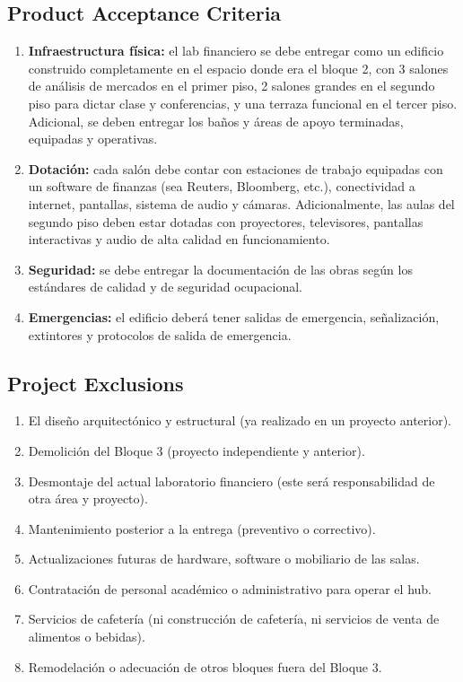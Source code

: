 \subsection{Product Acceptance Criteria}

\begin{enumerate}
    \item \textbf{Infraestructura física:} el lab financiero se debe entregar como un edificio construido completamente en el espacio donde era el bloque 2, con 3 salones de análisis de mercados en el primer piso, 2 salones grandes en el segundo piso para dictar clase y conferencias, y una terraza funcional en el tercer piso. Adicional, se deben entregar los baños y áreas de apoyo terminadas, equipadas y operativas.
    \item \textbf{Dotación:} cada salón debe contar con estaciones de trabajo equipadas con un software de finanzas (sea Reuters, Bloomberg, etc.), conectividad a internet, pantallas, sistema de audio y cámaras. Adicionalmente, las aulas del segundo piso deben estar dotadas con proyectores, televisores, pantallas interactivas y audio de alta calidad en funcionamiento.
    \item \textbf{Seguridad:} se debe entregar la documentación de las obras según los estándares de calidad y de seguridad ocupacional.
    \item \textbf{Emergencias:} el edificio deberá tener salidas de emergencia, señalización, extintores y protocolos de salida de emergencia.
\end{enumerate}

\subsection{Project Exclusions}

\begin{enumerate}
    \item El diseño arquitectónico y estructural (ya realizado en un proyecto anterior).
    \item Demolición del Bloque 3 (proyecto independiente y anterior).
    \item Desmontaje del actual laboratorio financiero (este será responsabilidad de otra área y proyecto).
    \item Mantenimiento posterior a la entrega (preventivo o correctivo).
    \item Actualizaciones futuras de hardware, software o mobiliario de las salas.
    \item Contratación de personal académico o administrativo para operar el hub.
    \item Servicios de cafetería (ni construcción de cafetería, ni servicios de venta de alimentos o bebidas).
    \item Remodelación o adecuación de otros bloques fuera del Bloque 3.
\end{enumerate}

